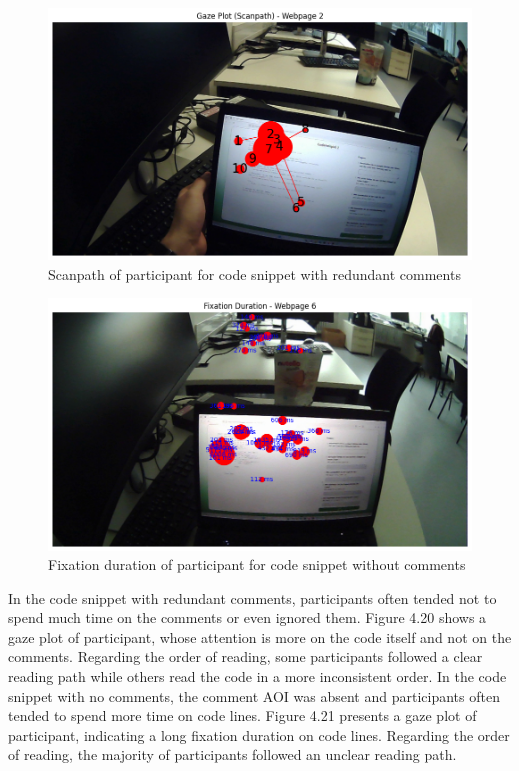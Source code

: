 \begin{figure} [H]
  \centering
  \includegraphics[scale=0.6]{figures/redun-com.png}
  \caption{Scanpath of  participant for code snippet with redundant comments}
  \label{fig:AnhangsChor}
\end{figure}


\begin{figure} [H]
  \centering
  \includegraphics[scale=0.6]{figures/0-com.png}
  \caption{Fixation duration of  participant for code snippet without comments}
  \label{fig:AnhangsChor}
\end{figure}


In the code snippet with redundant comments, participants often tended not to spend much time on the comments or even ignored them. Figure 4.20  shows a gaze plot of participant, whose attention  is more on the code itself and not on the comments. Regarding the order of reading, some participants followed a clear reading path while others read the code in a more inconsistent order.  In the code snippet with no comments, the comment AOI was absent and participants often tended to spend more time on code lines. Figure 4.21 presents a gaze plot of participant, indicating a long fixation duration on code lines.    Regarding the order of reading, the majority of participants followed an unclear reading path.



